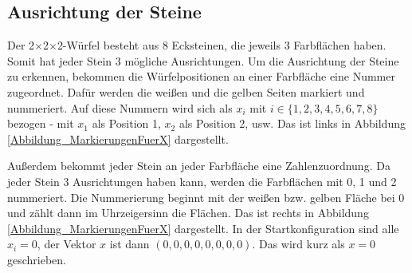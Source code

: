 \documentclass[12pt,a4paper, usenames, dvipsnames]{article}
\theoremstyle{mystyle}
\theoremstyle{definition}
\newcommand{\Ttwo}{2$\times$2$\times$2-}
\begin{document}
%
%
%
%
%
%
%
%
%
%
%
%
%
%
%
%
%
%
%
%
\subsection{Ausrichtung der Steine} 
 \label{Abschnitt_AusrichtungDerSteine}
Der \Ttwo Würfel besteht aus 8 Ecksteinen, die jeweils 3 Farbflächen haben. Somit hat jeder Stein 3 mögliche Ausrichtungen. 
Um die Ausrichtung der Steine zu erkennen, bekommen die Würfelpositionen an einer Farbfläche eine Nummer zugeordnet. Dafür werden die weißen und die gelben Seiten markiert und nummeriert. Auf diese Nummern wird sich als $x_i$ mit $i \in \lbrace 1, 2, 3, 4, 5, 6, 7, 8 \rbrace$ bezogen - mit $x_1$ als Position 1, $x_2$ als Position 2, usw. Das ist links in Abbildung \ref{Abbildung_MarkierungenFuerX} dargestellt.

Außerdem bekommt jeder Stein an jeder Farbfläche eine Zahlenzuordnung. Da jeder Stein 3 Ausrichtungen haben kann, werden die Farbflächen mit 0, 1 und 2 nummeriert. Die Nummerierung beginnt mit der weißen bzw. gelben Fläche bei 0 und zählt dann im Uhrzeigersinn die Flächen. Das ist rechts in Abbildung \ref{Abbildung_MarkierungenFuerX} dargestellt.
In der Startkonfiguration sind alle $x_i = 0$, der Vektor $x$ ist dann $(0, 0, 0, 0, 0, 0, 0, 0)$. Das wird kurz als $x=0$ geschrieben.
\end{document}
